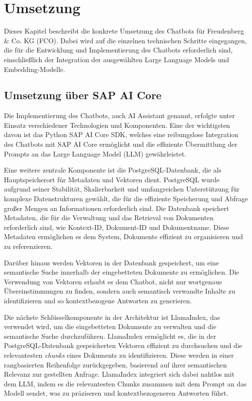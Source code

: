 \chapter{Umsetzung}
\label{umsetzung}

Dieses Kapitel beschreibt die konkrete Umsetzung des Chatbots für Freudenberg \& Co. KG (\ac{FCO}). 
Dabei wird auf die einzelnen technischen Schritte eingegangen, die für die Entwicklung und Implementierung des Chatbots erforderlich sind, einschließlich der Integration der ausgewählten Large Language Models und Embedding-Modelle.

\section{Umsetzung über SAP AI Core}

Die Implementierung des Chatbots, auch AI Assistant genannt, erfolgte unter Einsatz verschiedener Technologien und Komponenten. 
Eine der wichtigsten davon ist das Python SAP AI Core \ac{SDK}, welches eine reibungslose Integration des Chatbots mit SAP AI Core ermöglicht und die effiziente Übermittlung der Prompts an das Large Language Model (\ac{LLM}) gewährleistet.

Eine weitere zentrale Komponente ist die PostgreSQL-Datenbank, die als Hauptspeicherort für Metadaten und Vektoren dient. 
PostgreSQL wurde aufgrund seiner Stabilität, Skalierbarkeit und umfangreichen Unterstützung für komplexe Datenstrukturen gewählt, die für die effiziente Speicherung und Abfrage großer Mengen an Informationen erforderlich sind. 
Die Datenbank speichert Metadaten, die für die Verwaltung und das Retrieval von Dokumenten erforderlich sind, wie Kontext-ID, Dokument-ID und Dokumentname. 
Diese Metadaten ermöglichen es dem System, Dokumente effizient zu organisieren und zu referenzieren.

Darüber hinaus werden Vektoren in der Datenbank gespeichert, um eine semantische Suche innerhalb der eingebetteten Dokumente zu ermöglichen. 
Die Verwendung von Vektoren erlaubt es dem Chatbot, nicht nur wortgenaue Übereinstimmungen zu finden, sondern auch semantisch verwandte Inhalte zu identifizieren und so kontextbezogene Antworten zu generieren.

Die nächste Schlüsselkomponente in der Architektur ist LlamaIndex, das verwendet wird, um die eingebetteten Dokumente zu verwalten und die semantische Suche durchzuführen. 
LlamaIndex ermöglicht es, die in der PostgreSQL-Datenbank gespeicherten Vektoren effizient zu durchsuchen und die relevantesten \textit{chunks} eines Dokuments zu identifizieren. 
Diese werden in einer rangbasierten Reihenfolge zurückgegeben, basierend auf ihrer semantischen Relevanz zur gestellten Anfrage. 
LlamaIndex integriert sich dabei nahtlos mit dem \ac{LLM}, indem es die relevantesten Chunks zusammen mit dem Prompt an das Modell sendet, was zu präziseren und kontextbezogeneren Antworten führt.

